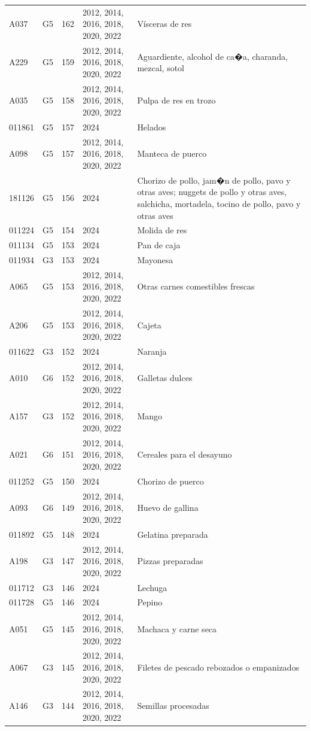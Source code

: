\begin{table}[ht]
\begin{tabular}{llrll}
  A037 & G5 & 162 & 2012, 2014, 2016, 2018, 2020, 2022 & Vísceras de res \\ 
  A229 & G5 & 159 & 2012, 2014, 2016, 2018, 2020, 2022 & Aguardiente, alcohol de ca�a, charanda, mezcal, sotol \\ 
  A035 & G5 & 158 & 2012, 2014, 2016, 2018, 2020, 2022 & Pulpa de res en trozo \\ 
  011861 & G5 & 157 & 2024 & Helados \\ 
  A098 & G5 & 157 & 2012, 2014, 2016, 2018, 2020, 2022 & Manteca de puerco \\ 
  181126 & G5 & 156 & 2024 & Chorizo de pollo, jam�n de pollo, pavo y otras aves; nuggets de pollo y otras aves, salchicha, mortadela, tocino de pollo, pavo y otras aves \\ 
  011224 & G5 & 154 & 2024 & Molida de res \\ 
  011134 & G5 & 153 & 2024 & Pan de caja \\ 
  011934 & G3 & 153 & 2024 & Mayonesa \\ 
  A065 & G5 & 153 & 2012, 2014, 2016, 2018, 2020, 2022 & Otras carnes comestibles frescas \\ 
  A206 & G5 & 153 & 2012, 2014, 2016, 2018, 2020, 2022 & Cajeta \\ 
  011622 & G3 & 152 & 2024 & Naranja \\ 
  A010 & G6 & 152 & 2012, 2014, 2016, 2018, 2020, 2022 & Galletas dulces \\ 
  A157 & G3 & 152 & 2012, 2014, 2016, 2018, 2020, 2022 & Mango \\ 
  A021 & G6 & 151 & 2012, 2014, 2016, 2018, 2020, 2022 & Cereales para el desayuno \\ 
  011252 & G5 & 150 & 2024 & Chorizo de puerco \\ 
  A093 & G6 & 149 & 2012, 2014, 2016, 2018, 2020, 2022 & Huevo de gallina \\ 
  011892 & G5 & 148 & 2024 & Gelatina preparada \\ 
  A198 & G3 & 147 & 2012, 2014, 2016, 2018, 2020, 2022 & Pizzas preparadas \\ 
  011712 & G3 & 146 & 2024 & Lechuga \\ 
  011728 & G5 & 146 & 2024 & Pepino \\ 
  A051 & G5 & 145 & 2012, 2014, 2016, 2018, 2020, 2022 & Machaca y carne seca \\ 
  A067 & G3 & 145 & 2012, 2014, 2016, 2018, 2020, 2022 & Filetes de pescado rebozados o empanizados \\ 
  A146 & G3 & 144 & 2012, 2014, 2016, 2018, 2020, 2022 & Semillas procesadas \\ 

\end{tabular}
\end{table}
